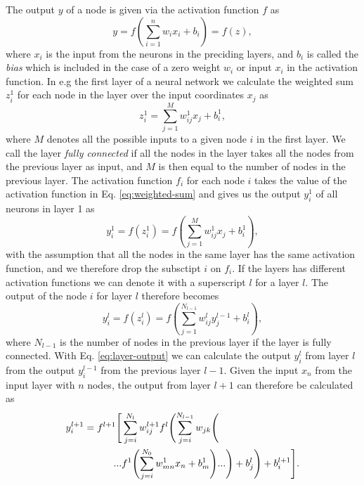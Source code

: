 \documentclass[../../main/main.tex]{subfiles}
\begin{document}
The output \(y\) of a node is given via the activation function \(f\) as
\begin{equation}
  \label{eq:2}
  y = f\left( \sum_{i=1}^n w_ix_i + b_i\right) = f(z),
\end{equation}
where \(x_i\) is the input from the neurons in the preciding layers, and \(b_i\) is called the \emph{bias} which is included in the case of a zero weight \(w_i\) or input \(x_i\) in the activation function. In e.g the first layer of a neural network we calculate the weighted sum \(z_i^1\) for each node in the layer over the input coordinates \(x_j\) as
\begin{equation}
  \label{eq:weighted-sum}
  z^1_i=\sum_{j=1}^M w_{ij}^1x_j+b_i^1,
\end{equation}
where \(M\) denotes all the possible inputs to a given node \(i\) in the first layer. We call the layer \emph{fully connected} if all the nodes in the layer takes all the nodes from the previous layer as input, and \(M\) is then equal to the number of nodes in the previous layer. The activation function \(f_i\) for each node \(i\) takes the value of the activation function in Eq. \eqref{eq:weighted-sum} and gives us the output \(y_i^1\) of all neurons in layer 1 as
\begin{equation}
  \label{eq:6}
  y_i^1 = f(z^1_i) = f \left( \sum_{j=1}^M w_{ij}^1x_j+b_i^1 \right), 
\end{equation}
with the assumption that all the nodes in the same layer has the same activation function, and we therefore drop the subsctipt \(i\) on \(f_i\). If the layers has different activation functions we can denote it with a superscript \(l\) for a layer \(l\). The output of the node \(i\) for layer \(l\) therefore becomes
\begin{equation}
  \label{eq:layer-output}
  y_i^l = f(z^l_i) = f \left( \sum_{j=1}^{N_{l-1}} w_{ij}^ly_j^{l-1}+b_i^l \right), 
\end{equation}
where \(N_{l-1}\) is the number of nodes in the previous layer if the layer is fully connected. With Eq. \eqref{eq:layer-output} we can calculate the output \(y_i^l\) from layer \(l\) from the output \(y_i^{l-1}\) from the previous layer \(l-1\). Given the input \(x_n\) from the input layer with \(n\) nodes, the output from layer \(l+1\) can therefore be calculated as
\begin{align}
  \label{eq:layer-output-l}
  y_i^{l+1} = f^{l+1}\Biggl[&\sum_{j=i}^{N_l} w_{ij}^{l+1}f^l\Biggl(\sum_{j=i}^{N_{l-1}} w_{jk} \Biggl(
  \notag \\
                            ...&f^1\Biggl(\sum_{j=i}^{N_0} w_{mn}^1x_n + b_m^1\Biggr) ... \Biggr) + b_j^l\Biggr) + b_i^{l+1}\Biggr].
\end{align}
\end{document}
